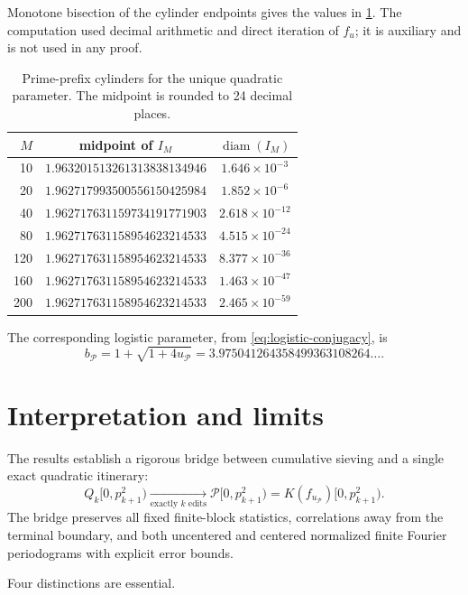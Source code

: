 \documentclass[11pt]{article}
\theoremstyle{definition}
\theoremstyle{remark}
\newcommand{\cP}{\mathcal{P}}
\newcommand{\uP}{u_{\mathcal P}}
\newcommand{\bP}{b_{\mathcal P}}
\DeclareMathOperator{\diam}{diam}
\begin{document}
Monotone bisection of the cylinder endpoints gives the values in \cref{tab:parameter-cylinders}.  The computation used decimal arithmetic and direct iteration of $f_u$; it is auxiliary and is not used in any proof.

\begin{table}[ht]
\centering
\caption{Prime-prefix cylinders for the unique quadratic parameter.  The midpoint is rounded to 24 decimal places.}\label{tab:parameter-cylinders}
\begin{tabular}{rcc}
\toprule
$M$ & midpoint of $I_M$ & $\diam(I_M)$\\
\midrule
10  & $1.963201513261313838134946$ & $1.646\times10^{-3}$\\
20  & $1.962717993500556150425984$ & $1.852\times10^{-6}$\\
40  & $1.962717631159734191771903$ & $2.618\times10^{-12}$\\
80  & $1.962717631158954623214533$ & $4.515\times10^{-24}$\\
120 & $1.962717631158954623214533$ & $8.377\times10^{-36}$\\
160 & $1.962717631158954623214533$ & $1.463\times10^{-47}$\\
200 & $1.962717631158954623214533$ & $2.465\times10^{-59}$\\
\bottomrule
\end{tabular}
\end{table}

The corresponding logistic parameter, from \eqref{eq:logistic-conjugacy}, is
\begin{equation}\label{eq:prime-logistic-parameter}
    \bP=1+\sqrt{1+4\uP}
    =3.975041264358499363108264\ldots.
\end{equation}

\section{Interpretation and limits}

The results establish a rigorous bridge between cumulative sieving and a single exact quadratic itinerary:
\[
    Q_k[0,p_{k+1}^2)
    \xrightarrow[\text{exactly }k\text{ edits}]{}
    \cP[0,p_{k+1}^2)
    =K(f_{\uP})[0,p_{k+1}^2).
\]
The bridge preserves all fixed finite-block statistics, correlations away from the terminal boundary, and both uncentered and centered normalized finite Fourier periodograms with explicit error bounds.

Four distinctions are essential.
\end{document}
